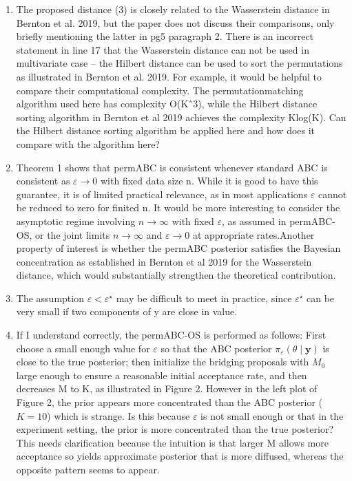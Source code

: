 \documentclass[10.5pt]{article}
\begin{document}
\begin{enumerate}
    \item The proposed distance (3) is closely related to the Wasserstein distance in Bernton et al. 2019, but the paper does not discuss their comparisons, only briefly mentioning the latter in pg5 paragraph 2. There is an incorrect statement in line 17 that the Wasserstein distance can not be used in multivariate case -- the Hilbert distance can be used to sort the permutations as illustrated in Bernton et al. 2019. For example, it would be helpful to compare their computational complexity. The permutationmatching algorithm used here has complexity O(Kˆ3), while the Hilbert distance sorting algorithm in Bernton et al 2019 achieves the complexity Klog(K). Can the Hilbert distance sorting algorithm be applied here and how does it compare with the algorithm here?
    \item Theorem 1 shows that permABC is consistent whenever standard ABC is consistent as $\varepsilon \to 0$ with fixed data size n. While it is good to have this guarantee, it is of limited practical relevance, as in most applications $\varepsilon$ cannot be reduced to zero for finited n. It would be more interesting to consider the asymptotic regime involving $n \to \infty$ with fixed $\varepsilon$, as assumed in permABC-OS, or the joint limits $n \to \infty$ and $\varepsilon \to 0$ at appropriate rates.Another property of interest is whether the permABC posterior satisfies the Bayesian concentration as established in Bernton et al 2019 for the Wasserstein distance, which would substantially strengthen the theoretical contribution.
    \item  The assumption $\varepsilon < \varepsilon^{\star}$ may be difficult to meet in practice, since $\varepsilon^{\star}$ can be very small if two components of y are close in value.
    \item If I understand correctly, the permABC-OS is performed as follows: First choose a small enough value for $\varepsilon$ so that the ABC posterior $\pi_{\varepsilon}(\theta\mid \boldsymbol{y})$ is close to the true posterior; then initialize the bridging proposals with $M_0$ large enough to ensure a reasonable initial acceptance rate, and then decreases M to K, as illustrated in Figure 2. However in the left plot of Figure 2, the prior appears more concentrated than the ABC posterior ($K=10$) which is strange. Is this because $\varepsilon$ is not small enough or that in the experiment setting, the prior is more concentrated than the true posterior? This needs clarification because the intuition is that larger M allows more acceptance so yields approximate posterior that is more diffused, whereas the opposite pattern seems to appear.

\end{enumerate}
\end{document}
